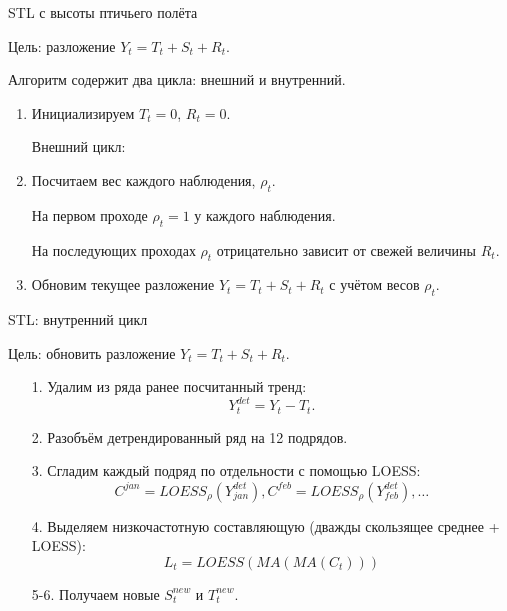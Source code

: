 \begin{frame}{STL с высоты птичьего полёта}

Цель: разложение $Y_t = T_t + S_t + R_t$.

Алгоритм содержит два цикла: \alert{внешний} и \alert{внутренний}.

\begin{enumerate}[<+->]

  \item Инициализируем $T_t = 0$, $R_t = 0$.
  
  \alert{Внешний} цикл:

  \item Посчитаем вес каждого наблюдения, $\rho_t$. 

  На первом проходе $\rho_t = 1$ у каждого наблюдения. 

  На последующих проходах $\rho_t$ отрицательно зависит от свежей величины $R_t$.

  \item Обновим текущее разложение $Y_t = T_t + S_t + R_t$ с учётом весов $\rho_t$.
\end{enumerate}

\end{frame}



\begin{frame}{STL: внутренний цикл}

  Цель: обновить разложение $Y_t = T_t + S_t + R_t$.
  
  \begin{enumerate}[<+->]
  
    \item[1.] Удалим из ряда ранее посчитанный тренд:
    \[
      Y_t^{det} = Y_t - T_t.
    \]
    
    \item[2.] Разобъём детрендированный ряд на 12 подрядов. 
    
    \item[3.] Сгладим каждый подряд по отдельности с помощью LOESS:
    \[
    C^{jan} = LOESS_{\rho}(Y^{det}_{jan}), C^{feb} = LOESS_{\rho}(Y^{det}_{feb}), \ldots
    \]

    \item[4.] Выделяем низкочастотную составляющую (дважды скользящее среднее + LOESS):
    \[
    L_t = LOESS(MA(MA(C_t)))
    \]    
    \item[5-6.] Получаем новые $S_t^{new}$ и $T_t^{new}$.
  \end{enumerate}
  
  
  \end{frame}
  


